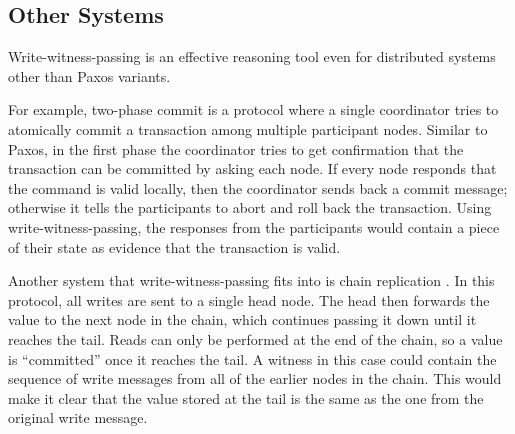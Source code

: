 \subsection{Other Systems}
\label{subsec:other-systems}
Write-witness-passing is an effective reasoning tool even for distributed systems other than Paxos variants.
For example, two-phase commit is a protocol where a single coordinator tries to atomically commit a
transaction among multiple participant nodes.
Similar to Paxos, in the first phase the coordinator tries to get confirmation that the transaction
can be committed by asking each node.
If every node responds that the command is valid locally, then the coordinator sends back a
commit message; otherwise it tells the participants to abort and roll back the transaction.
Using write-witness-passing, the responses from the participants would contain a piece of their
state as evidence that the transaction is valid.

Another system that write-witness-passing fits into is chain replication \cite{chainreplication}.
In this protocol, all writes are sent to a single head node.
The head then forwards the value to the next node in the chain, which continues passing it down
until it reaches the tail.
Reads can only be performed at the end of the chain, so a value is ``committed'' once it reaches the
tail.
A witness in this case could contain the sequence of write messages from all of the earlier nodes in
the chain.
This would make it clear that the value stored at the tail is the same as the one from the original write message.


